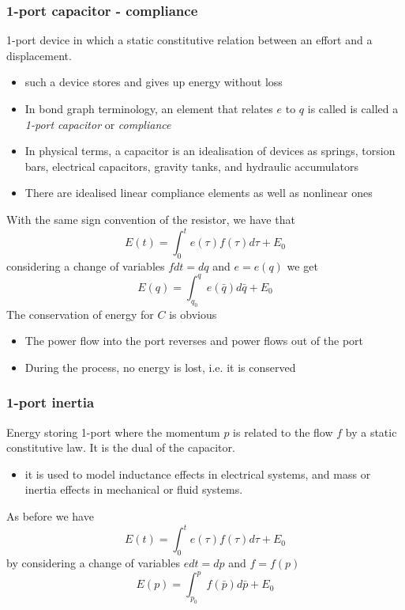 \documentclass{book}
\begin{document}
\subsubsection{1-port capacitor - compliance}
1-port device in which a static constitutive relation between an effort and a displacement. 
\begin{itemize}
    \item such a device stores and gives up energy without loss 
    \item In bond graph terminology, an element that relates $e$ to $q$ is called is called a \emph{1-port capacitor} or \emph{compliance}
    \item In physical terms, a capacitor is an idealisation of devices as springs, torsion bars, electrical capacitors, gravity tanks, and hydraulic accumulators 
    \item There are idealised linear compliance elements as well as nonlinear ones
\end{itemize}
With the same sign convention of the resistor, we have that
\[
    E(t) = \displaystyle\int_{0}^{t}e(\tau)f(\tau)d\tau+E_0
\]
considering a change of variables $f d t = d q$ and $e=e(q)$ we get 
\[
    E(q) = \displaystyle\int_{q_0}^{q}e(\bar{q})d \bar{q} + E_0
\]
The conservation of energy for $C$ is obvious
\begin{itemize}
    \item The power flow into the port reverses and power flows out of the port 
    \item During the process, no energy is lost, i.e. it is conserved
\end{itemize}

\subsubsection{1-port inertia}
Energy storing 1-port where the momentum $p$ is related to the flow $f$ by a static constitutive law. It is the dual of the capacitor. 
\begin{itemize}
    \item it is used to model inductance effects in electrical systems, and mass or inertia effects in mechanical or fluid systems.
\end{itemize}
As before we have 
\[
    E(t) = \displaystyle\int_{0}^{t}e(\tau)f(\tau)d\tau+E_0 
\]
by considering a change of variables $edt=dp$ and $f=f(p)$
\[
    E(p) = \displaystyle\int_{p_0}^{p}f(\bar{p})d\bar{p}+E_0
\]
\end{document}
